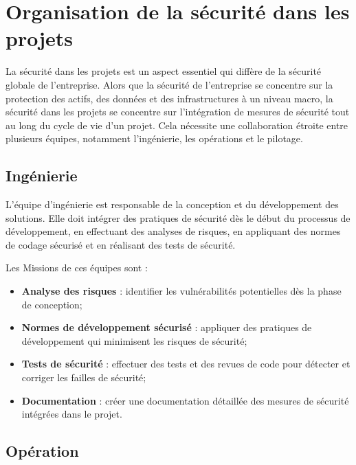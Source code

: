 \section{Organisation de la sécurité dans les projets}

La sécurité dans les projets est un aspect essentiel qui diffère de la sécurité globale de l'entreprise. Alors que la sécurité de l'entreprise se concentre sur la protection des actifs, des données et des infrastructures à un niveau macro, la sécurité dans les projets se concentre sur l'intégration de mesures de sécurité tout au long du cycle de vie d'un projet. Cela nécessite une collaboration étroite entre plusieurs équipes, notamment l'ingénierie, les opérations et le pilotage.

\subsection{Ingénierie}
L'équipe d'ingénierie est responsable de la conception et du développement des solutions. Elle doit intégrer des pratiques de sécurité dès le début du processus de développement, en effectuant des analyses de risques, en appliquant des normes de codage sécurisé et en réalisant des tests de sécurité.

Les Missions de ces équipes sont :
\begin{itemize}
    \item \textbf{Analyse des risques} : identifier les vulnérabilités potentielles dès la phase de conception;
    \item \textbf{Normes de développement sécurisé} : appliquer des pratiques de développement qui minimisent les risques de sécurité;
    \item \textbf{Tests de sécurité} : effectuer des tests et des revues de code pour détecter et corriger les failles de sécurité;
    \item \textbf{Documentation} : créer une documentation détaillée des mesures de sécurité intégrées dans le projet.
\end{itemize}

\subsection{Opération}

